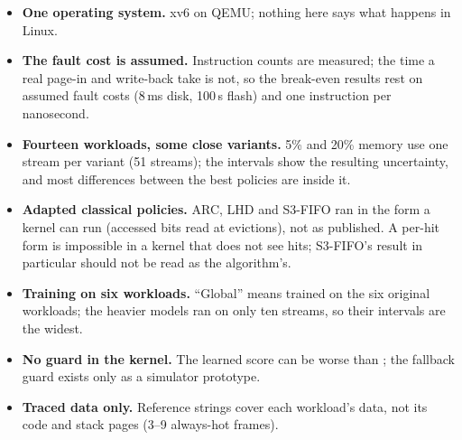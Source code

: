 \begin{itemize}
\item \textbf{One operating system.} xv6 on QEMU; nothing here says what happens in Linux.
\item \textbf{The fault cost is assumed.} Instruction counts are measured; the time a real
  page-in and write-back take is not, so the break-even results rest on assumed fault
  costs (8\,ms disk, 100\,\textmu s flash) and one instruction per nanosecond.
\item \textbf{Fourteen workloads, some close variants.} 5\% and 20\% memory use one stream
  per variant (51 streams); the intervals show the resulting uncertainty, and most
  differences between the best policies are inside it.
\item \textbf{Adapted classical policies.} ARC, LHD and S3-FIFO ran in the form a kernel
  can run (accessed bits read at evictions), not as published. A per-hit form is
  impossible in a kernel that does not see hits; S3-FIFO's result in particular should not
  be read as the algorithm's.
\item \textbf{Training on six workloads.} ``Global'' means trained on the six original
  workloads; the heavier models ran on only ten streams, so their intervals are the widest.
\item \textbf{No guard in the kernel.} The learned score can be worse than \clock; the
  fallback guard exists only as a simulator prototype.
\item \textbf{Traced data only.} Reference strings cover each workload's data, not its code
  and stack pages (3--9 always-hot frames).
\end{itemize}
